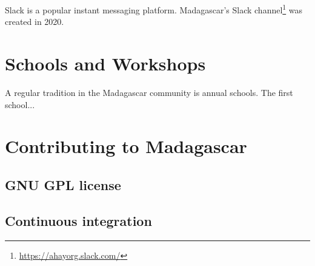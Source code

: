 Slack is a popular instant messaging platform. Madagascar's Slack
channel\footnote{\url{https://ahayorg.slack.com/}} was created in
2020.

\section{Schools and Workshops}

A regular tradition in the Madagascar community is annual schools. The first school...

\section{Contributing to Madagascar}

\subsection{GNU GPL license}

\subsection{Continuous integration}
